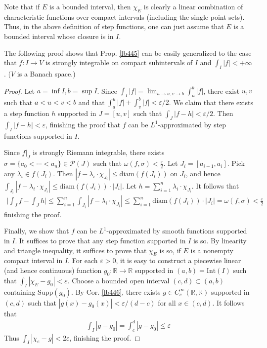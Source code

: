 \documentclass[12pt,b5paper,notitlepage]{article}
\theoremstyle{definition}
\theoremstyle{plain}
\newcommand{\mc}{\mathcal}
\newcommand{\Rbb}{\mathbb R}
\newcommand{\Supp}{\mathrm{Supp}}
\newcommand{\Int}{\mathrm{Int}}
\newcommand{\diam}{\mathrm{diam}}
\newcommand{\eps}{\varepsilon}
\numberwithin{equation}{section}
\begin{document}
Note that if $E$ is a bounded interval, then $\chi_E$ is clearly a linear combination of characteristic functions over compact intervals (including the single point sets). Thus, in the above definition of step functions, one can just assume that $E$ is a bounded interval whose closure is in $I$.

The following proof shows that Prop. \ref{lb445} can be easily generalized to the case that $f:I\rightarrow V$ is strongly integrable on compact subintervals of $I$ and $\int_I|f|<+\infty$. ($V$ is a Banach space.)

\begin{proof}
Let $a=\inf I,b=\sup I$. Since $\int_I|f|=\lim_{u\rightarrow a,v\rightarrow b} \int_a^b|f|$, there exist $u,v$ such that $a<u<v<b$ and that $\int_a^u|f|+\int_v^b|f|<\eps/2$. We claim that there exists a step function $h$ supported in $J=[u,v]$ such that $\int_J |f-h|<\eps/2$. Then $\int_I|f-h|<\eps$, finishing the proof that $f$ can be $L^1$-approximated by step functions supported in $I$.

Since $f|_J$ is strongly Riemann integrable, there exists $\sigma=\{a_0<\cdots<a_n\}\in\mc P(J)$ such that $\omega(f,\sigma)<\frac\eps 2$. Let $J_i=[a_{i-1},a_i]$. Pick any $\lambda_i\in f(J_i)$. Then $|f-\lambda_i\cdot\chi_{J_i}|\leq\diam(f(J_i))$ on $J_i$, and hence $\int_{J_i}|f-\lambda_i\cdot\chi_{J_i}|\leq \diam(f(J_i))\cdot|J_i|$. Let $h=\sum_{i=1}^n\lambda_i\cdot\chi_{J_i}$. It follows that
\begin{align*}
\Big|\int_J f-\int_Jh  \Big|\leq\sum_{i=1}^n\int_{J_i}|f-\lambda_i\cdot\chi_{J_i}|\leq\sum_{i=1}^n\diam(f(J_i))\cdot|J_i|=\omega(f,\sigma)<\frac\eps 2
\end{align*}
finishing the proof.

Finally, we show that $f$ can be $L^1$-approximated by smooth functions supported in $I$. It suffices to prove that any step function supported in $I$ is so. By linearity and triangle inequality, it suffices to prove that $\chi_E$ is so, if $E$ is a nonempty compact interval in $I$. For each $\eps>0$, it is easy to construct a piecewise linear (and hence continuous) function $g_0:\Rbb\rightarrow\Rbb$ supported in $(a,b)=\Int(I)$ such that $\int_I|\chi_E-g_0|<\eps$. Choose a bounded open interval $(c,d)\subset (a,b)$ containing $\Supp(g_0)$. By Cor. \ref{lb446}, there exists $g\in C_c^\infty(\Rbb,\Rbb)$ supported in $(c,d)$ such that $|g(x)-g_0(x)|<\eps/(d-c)$ for all $x\in(c,d)$. It follows that
\begin{align*}
\int_I|g-g_0|=\int_c^d |g-g_0|\leq\eps
\end{align*}
Thus $\int_I|\chi_e-g|<2\eps$, finishing the proof.
\end{proof}
\end{document}

